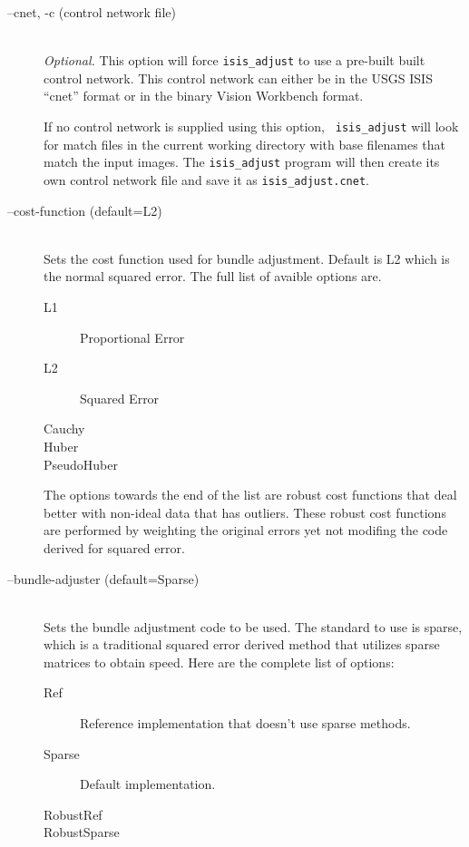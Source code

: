 \begin{description}

\item[--cnet, -c \textnormal{\small{(control network file)}}] \hfill \\
  \emph{Optional.} This option will force {\tt isis\_adjust} to
  use a pre-built built control network. This control network can
  either be in the USGS ISIS ``cnet'' format or in the binary Vision
  Workbench format.

  If no control network is supplied using this option, {\tt
    isis\_adjust} will look for match files in the current working
  directory with base filenames that match the input images.  The
  \texttt{isis\_adjust} program will then create its own control
  network file and save it as \texttt{isis\_adjust.cnet}.

\item[--cost-function \textnormal{\small{(default=L2)}}] \hfill \\

  Sets the cost function used for bundle adjustment. Default is L2
  which is the normal squared error. The full list of avaible options
  are.

  \begin{description}
    \item[L1] Proportional Error
    \item[L2] Squared Error
    \item[Cauchy]
    \item[Huber]
    \item[PseudoHuber]
  \end{description}

  The options towards the end of the list are robust cost functions
  that deal better with non-ideal data that has outliers. These robust
  cost functions are performed by weighting the original errors yet
  not modifing the code derived for squared error.

\item[--bundle-adjuster \textnormal{\small{(default=Sparse)}}] \hfill \\

  Sets the bundle adjustment code to be used. The standard to use is
  sparse, which is a traditional squared error derived method that
  utilizes sparse matrices to obtain speed. Here are the complete list
  of options:

  \begin{description}
    \item[Ref] Reference implementation that doesn't use sparse methods.
    \item[Sparse] Default implementation.
    \item[RobustRef]
    \item[RobustSparse]
  \end{description}


\end{description}
